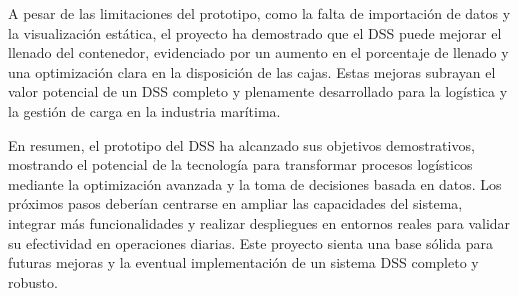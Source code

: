 \documentclass[9pt,a4paper]{rho}
\begin{document}
A pesar de las limitaciones del prototipo, como la falta de importación de datos y la visualización estática, el proyecto ha demostrado que el DSS puede mejorar el llenado del contenedor, evidenciado por un aumento en el porcentaje de llenado y una optimización clara en la disposición de las cajas. Estas mejoras subrayan el valor potencial de un DSS completo y plenamente desarrollado para la logística y la gestión de carga en la industria marítima.

En resumen, el prototipo del DSS ha alcanzado sus objetivos demostrativos, mostrando el potencial de la tecnología para transformar procesos logísticos mediante la optimización avanzada y la toma de decisiones basada en datos. Los próximos pasos deberían centrarse en ampliar las capacidades del sistema, integrar más funcionalidades y realizar despliegues en entornos reales para validar su efectividad en operaciones diarias. Este proyecto sienta una base sólida para futuras mejoras y la eventual implementación de un sistema DSS completo y robusto.



\printbibliography[title={Referencias}]

\end{document}
